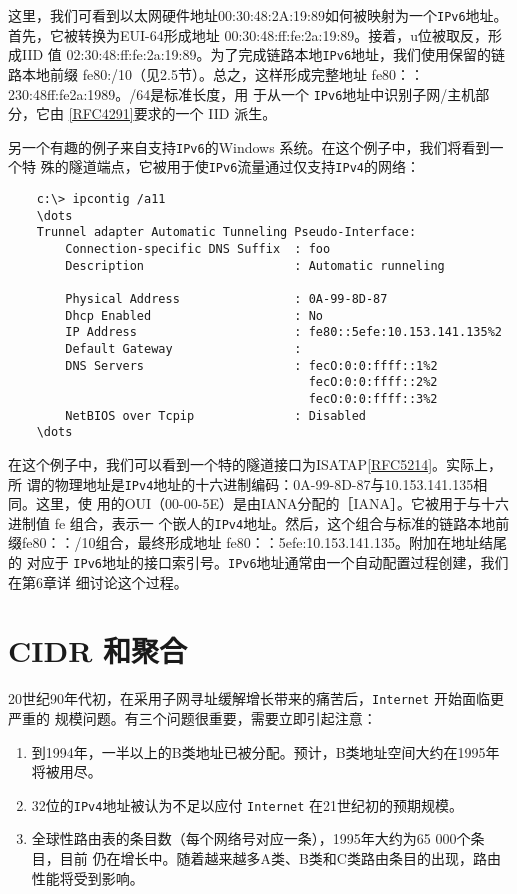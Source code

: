 这里，我们可看到以太网硬件地址00:30:48:2A:19:89如何被映射为一个\verb|IPv6|地址。
首先，它被转换为EUI-64形成地址 00:30:48:ff:fe:2a:19:89。接着，u位被取反，形成IID
值 02:30:48:ff:fe:2a:19:89。为了完成链路本地\verb|IPv6|地址，我们使用保留的链路本地前缀
fe80:/10（见2.5节）。总之，这样形成完整地址 fe80：：230:48ff:fe2a:1989。/64是标准长度，用
于从一个 \verb|IPv6|地址中识别子网/主机部分，它由 \href{https://www.rfc-editor.org/rfc/rfc4291}{[RFC4291]}要求的一个 IID 派生。

另一个有趣的例子来自支持\verb|IPv6|的Windows 系统。在这个例子中，我们将看到一个特
殊的隧道端点，它被用于使\verb|IPv6|流量通过仅支持\verb|IPv4|的网络：
\begin{verbatim}
    c:\> ipcontig /a11
    \dots
    Trunnel adapter Automatic Tunneling Pseudo-Interface:
        Connection-specific DNS Suffix  : foo
        Description                     : Automatic runneling

        Physical Address                : 0A-99-8D-87
        Dhcp Enabled                    : No
        IP Address                      : fe80::5efe:10.153.141.135%2
        Default Gateway                 :
        DNS Servers                     : fecO:0:0:ffff::1%2
                                          fecO:0:0:ffff::2%2
                                          fecO:0:0:ffff::3%2
        NetBIOS over Tcpip              : Disabled
    \dots
\end{verbatim}

在这个例子中，我们可以看到一个特的隧道接口为ISATAP\href{https://www.rfc-editor.org/rfc/rfc5214}{[RFC5214]}。实际上，所
谓的物理地址是\verb|IPv4|地址的十六进制编码：0A-99-8D-87与10.153.141.135相同。这里，使
用的OUI（00-00-5E）是由IANA分配的［IANA］。它被用于与十六进制值 fe 组合，表示一
个嵌人的\verb|IPv4|地址。然后，这个组合与标准的链路本地前缀fe80：：/10组合，最终形成地址
fe80：：5efe:10.153.141.135。附加在地址结尾的%
对应于 \verb|IPv6|地址的接口索引号。\verb|IPv6|地址通常由一个自动配置过程创建，我们在第6章详
细讨论这个过程。

\section{CIDR 和聚合}
20世纪90年代初，在采用子网寻址缓解增长带来的痛苦后，\verb|Internet| 开始面临更严重的
规模问题。有三个问题很重要，需要立即引起注意：

\begin{enumerate}
    \item 到1994年，一半以上的B类地址已被分配。预计，B类地址空间大约在1995年将被用尽。
    \item 32位的\verb|IPv4|地址被认为不足以应付 \verb|Internet| 在21世纪初的预期规模。
    \item 全球性路由表的条目数（每个网络号对应一条），1995年大约为65 000个条目，目前
    仍在增长中。随着越来越多A类、B类和C类路由条目的出现，路由性能将受到影响。
\end{enumerate}

